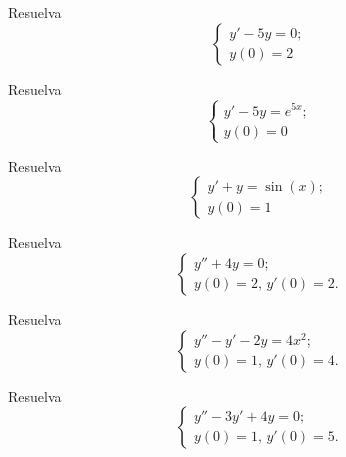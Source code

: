  \begin{problema}
  \label{bron:exmp:24.1}
  Resuelva
  $$\begin{cases}
     y'-5y=0;\\
     y(0)=2
    \end{cases}
$$
 \end{problema}




 \begin{problema}
  \label{bron:exmp:24.2}
  Resuelva
  $$\begin{cases}
     y'-5y=e^{5x};\\
     y(0)=0
    \end{cases}
$$
 \end{problema}




 \begin{problema}
  \label{bron:exmp:24.3}
  Resuelva
  $$\begin{cases}
     y'+y=\sin(x);\\
     y(0)=1
    \end{cases}
$$
 \end{problema}




 \begin{problema}
  \label{bron:exmp:24.4}
  Resuelva
  $$\begin{cases}
     y''+4y=0;\\
     y(0)=2, \, y'(0)=2.
    \end{cases}
$$
 \end{problema}




 \begin{problema}
  \label{bron:exmp:24.6}
  Resuelva
  $$\begin{cases}
     y''-y'-2y=4x^{2};\\
     y(0)=1, \, y'(0)=4.
    \end{cases}
$$
 \end{problema}




 \begin{problema}
  \label{bron:exmp:24.5}
  Resuelva
  $$\begin{cases}
     y''-3y'+4y=0;\\
     y(0)=1, \, y'(0)=5.
    \end{cases}
$$
 \end{problema}




